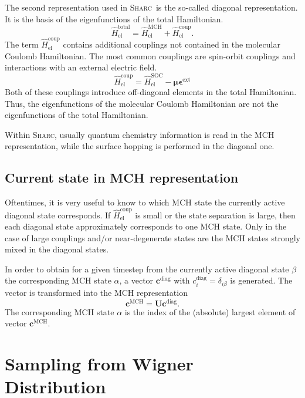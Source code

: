 \documentclass[a4paper,11pt,DIV=15,openany,twoside=false]{scrbook}
\newcommand{\sharc}{\textsc{Sharc}}
\newcommand{\VEC}[1]{\ensuremath{\mathbf{#1}}}
\begin{document}
The second representation used in \sharc\ is the so-called diagonal representation. It is the basis of the eigenfunctions of the total Hamiltonian.
\begin{equation}
  \hat{H}_{\text{el}}^{\text{total}}
  =\hat{H}_{\text{el}}^{\text{MCH}}
  +\hat{H}_{\text{el}}^{\text{coup}}.
\end{equation}
The term $\hat{H}_{\text{el}}^{\text{coup}}$ contains additional couplings not contained in the molecular Coulomb Hamiltonian. The most common couplings are spin-orbit couplings and interactions with an external electric field.
\begin{equation}
  \hat{H}_{\text{el}}^{\text{coup}}=\hat{H}_{\text{el}}^{\text{SOC}}-\boldsymbol{\mu}\boldsymbol{\epsilon}^{\text{ext}}
\end{equation}
Both of these couplings introduce off-diagonal elements in the total Hamiltonian. Thus, the eigenfunctions of the molecular Coulomb Hamiltonian are not the eigenfunctions of the total Hamiltonian. 

Within \sharc, usually quantum chemistry information is read in the MCH representation, while the surface hopping is performed in the diagonal one.

\subsection{Current state in MCH representation}\label{ssec:state_transform}

Oftentimes, it is very useful to know to which MCH state the currently active diagonal state corresponds. If $\hat{H}_{\text{el}}^{\text{coup}}$ is small or the state separation is large, then each diagonal state approximately corresponds to one MCH state. Only in the case of large couplings and/or near-degenerate states are the MCH states strongly mixed in the diagonal states.

In order to obtain for a given timestep from the currently active diagonal state $\beta$ the corresponding MCH state $\alpha$, a vector $\VEC{c}^\text{diag}$ with $c_i^\text{diag}=\delta_{i\beta}$ is generated. The vector is transformed into the MCH representation
\begin{equation}
  \VEC{c}^\text{MCH}=\VEC{U}\VEC{c}^\text{diag}.
\end{equation}
The corresponding MCH state $\alpha$ is the index of the (absolute) largest element of vector $\VEC{c}^\text{MCH}$.


\section{Sampling from Wigner Distribution}\label{met:wigner}
\end{document}
